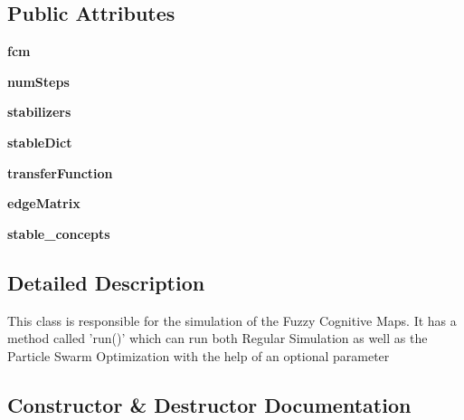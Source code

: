 \subsection*{Public Attributes}
\begin{DoxyCompactItemize}
\item 
\hypertarget{class_simulation_1_1simulation_a671846c113f0a9dc83286c5ad9512285}{}\label{class_simulation_1_1simulation_a671846c113f0a9dc83286c5ad9512285} 
{\bfseries fcm}
\item 
\hypertarget{class_simulation_1_1simulation_a868424f7c18c88721f794fa099eadec7}{}\label{class_simulation_1_1simulation_a868424f7c18c88721f794fa099eadec7} 
{\bfseries num\+Steps}
\item 
\hypertarget{class_simulation_1_1simulation_aec4266415db730e604fd19efd35bef84}{}\label{class_simulation_1_1simulation_aec4266415db730e604fd19efd35bef84} 
{\bfseries stabilizers}
\item 
\hypertarget{class_simulation_1_1simulation_af0a20076b369e7b1917db3dcd5b77f60}{}\label{class_simulation_1_1simulation_af0a20076b369e7b1917db3dcd5b77f60} 
{\bfseries stable\+Dict}
\item 
\hypertarget{class_simulation_1_1simulation_a0bf335dc7d60b29f151285ebfca3e665}{}\label{class_simulation_1_1simulation_a0bf335dc7d60b29f151285ebfca3e665} 
{\bfseries transfer\+Function}
\item 
\hypertarget{class_simulation_1_1simulation_a90288804c2a984095032eac0218bf92b}{}\label{class_simulation_1_1simulation_a90288804c2a984095032eac0218bf92b} 
{\bfseries edge\+Matrix}
\item 
\hypertarget{class_simulation_1_1simulation_a3c3e4f6c4750204ae65db87b36bd3533}{}\label{class_simulation_1_1simulation_a3c3e4f6c4750204ae65db87b36bd3533} 
{\bfseries stable\+\_\+concepts}
\end{DoxyCompactItemize}


\subsection{Detailed Description}
\begin{DoxyVerb}This class is responsible for the simulation of the Fuzzy Cognitive Maps.
It has a method called 'run()' which can run both Regular Simulation as
well as the Particle Swarm Optimization with the help of an optional parameter\end{DoxyVerb}
 

\subsection{Constructor \& Destructor Documentation}
\hypertarget{class_simulation_1_1simulation_a0f0377da7ec6ea298232042744c03e89}{}\label{class_simulation_1_1simulation_a0f0377da7ec6ea298232042744c03e89} 
